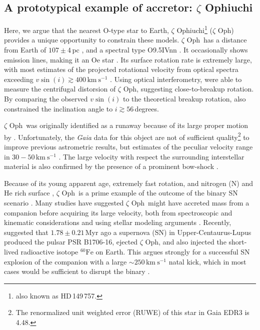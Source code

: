 \documentclass[twocolumn,twocolappendix,trackchanges]{aastex63}
\newcommand{\kms}{{\mathrm{km\ s^{-1}}}}
\newcommand{\zoph}{$\zeta$ Oph}
\begin{document}
\subsection{A prototypical example of accretor: $\zeta$ Ophiuchi}

Here, we argue that the nearest O-type star to Earth, $\zeta$
Ophiuchi\footnote{also known as HD\,149\,757.} (\zoph) provides a
unique opportunity to constrain these models.  \zoph\ has a distance
from Earth of $107\pm4$\,pc \citep[][and references
therein]{neuhauser:20}, and a spectral type O9.5{\rm IVnn}
\citep{sota:14}. It occasionally shows emission lines, making it an Oe
star \citep{walker:79, vink:09}. Its surface rotation rate is
extremely large, with most estimates of the projected rotational
velocity from optical spectra exceeding $v\sin(i)\gtrsim 400\,\kms$
\citep[corresponding to the ``nn'' in the spectral type,
e.g.,][]{zehe:18}. Using optical interferometry, \cite{gordon:18} were
able to measure the centrifugal distorsion of \zoph, suggesting
close-to-breakup rotation.  By comparing the observed $v\sin(i)$ to
the theoretical breakup rotation, \cite{zehe:18} also constrained the
inclination angle to $i\gtrsim 56$\,degrees.

\zoph\ was originally
identified as a runaway because of its large proper motion by
\cite{blaauw:52}. Unfortunately, the \emph{Gaia} data for this object
are not of sufficient quality\footnote{The renormalized unit weighted
  error (RUWE) of this star in Gaia EDR3 is 4.48.} to improve previous astrometric results,
but estimates of the peculiar velocity range in $30-50\,\kms$
\citep[e.g.,][]{zehe:18, neuhauser:20}. The large velocity with
respect the surrounding interstellar material is also confirmed by the
presence of a prominent bow-shock \citep[e.g.,][]{bodensteiner:18}.

Because of its young apparent age, extremely fast rotation, and nitrogen
(N) and He rich surface \citep[e.g.,][]{herrero:92, blaauw:93,
  villamariz:05, marcolino:09}, \zoph\ is a prime example of the
outcome of the binary SN scenario \citep{blaauw:93}. Many studies have suggested
\zoph\ might have accreted mass from a companion before acquiring its
large velocity, both from spectroscopic and kinematic considerations
\citep[e.g.,][]{blaauw:93, hoogerwerf:00, hoogerwerf:01, tetzlaff:10,
  neuhauser:20} and using stellar modeling arguments
\citep[e.g.,][]{vanrensbergen:96}. Recently, \cite{neuhauser:20}
suggested that $1.78\pm0.21$\,Myr ago a supernova (SN) in
Upper-Centaurus-Lupus produced the pulsar PSR B1706-16, ejected \zoph,
and also injected the short-lived radioactive isotope
$^{60}\mathrm{Fe}$ on Earth. This argues strongly for a successful
SN explosion of the companion with a large $\sim 250\,\kms$ natal
kick, which in most cases would be sufficient to disrupt the binary
\citep[e.g.,][]{tauris:15, renzo:19walk, evans:20}.
\end{document}
